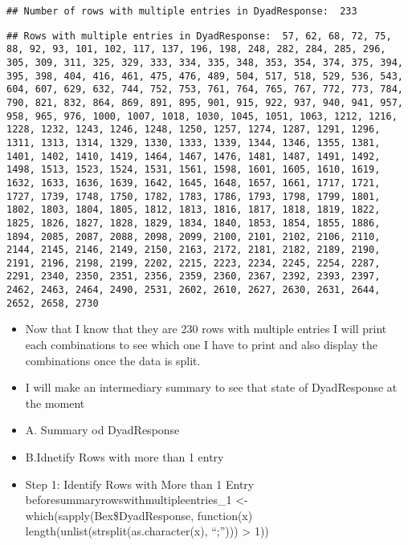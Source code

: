 \documentclass[
]{article}
\begin{document}
\begin{verbatim}
## Number of rows with multiple entries in DyadResponse:  233
\end{verbatim}

\begin{verbatim}
## Rows with multiple entries in DyadResponse:  57, 62, 68, 72, 75, 88, 92, 93, 101, 102, 117, 137, 196, 198, 248, 282, 284, 285, 296, 305, 309, 311, 325, 329, 333, 334, 335, 348, 353, 354, 374, 375, 394, 395, 398, 404, 416, 461, 475, 476, 489, 504, 517, 518, 529, 536, 543, 604, 607, 629, 632, 744, 752, 753, 761, 764, 765, 767, 772, 773, 784, 790, 821, 832, 864, 869, 891, 895, 901, 915, 922, 937, 940, 941, 957, 958, 965, 976, 1000, 1007, 1018, 1030, 1045, 1051, 1063, 1212, 1216, 1228, 1232, 1243, 1246, 1248, 1250, 1257, 1274, 1287, 1291, 1296, 1311, 1313, 1314, 1329, 1330, 1333, 1339, 1344, 1346, 1355, 1381, 1401, 1402, 1410, 1419, 1464, 1467, 1476, 1481, 1487, 1491, 1492, 1498, 1513, 1523, 1524, 1531, 1561, 1598, 1601, 1605, 1610, 1619, 1632, 1633, 1636, 1639, 1642, 1645, 1648, 1657, 1661, 1717, 1721, 1727, 1739, 1748, 1750, 1782, 1783, 1786, 1793, 1798, 1799, 1801, 1802, 1803, 1804, 1805, 1812, 1813, 1816, 1817, 1818, 1819, 1822, 1825, 1826, 1827, 1828, 1829, 1834, 1840, 1853, 1854, 1855, 1886, 1894, 2085, 2087, 2088, 2098, 2099, 2100, 2101, 2102, 2106, 2110, 2144, 2145, 2146, 2149, 2150, 2163, 2172, 2181, 2182, 2189, 2190, 2191, 2196, 2198, 2199, 2202, 2215, 2223, 2234, 2245, 2254, 2287, 2291, 2340, 2350, 2351, 2356, 2359, 2360, 2367, 2392, 2393, 2397, 2462, 2463, 2464, 2490, 2531, 2602, 2610, 2627, 2630, 2631, 2644, 2652, 2658, 2730
\end{verbatim}

\begin{itemize}
\item
  Now that I know that they are 230 rows with multiple entries I will
  print each combinations to see which one I have to print and also
  display the combinations once the data is split.
\item
  I will make an intermediary summary to see that state of DyadResponse
  at the moment
\item
  A. Summary od DyadResponse
\item
  B.Idnetify Rows with more than 1 entry
\item
  Step 1: Identify Rows with More than 1 Entry
  beforesummaryrowswithmultipleentries\_1 \textless-
  which(sapply(Bex\$DyadResponse, function(x)
  length(unlist(strsplit(as.character(x), ``;''))) \textgreater{} 1))
\end{itemize}
\end{document}
